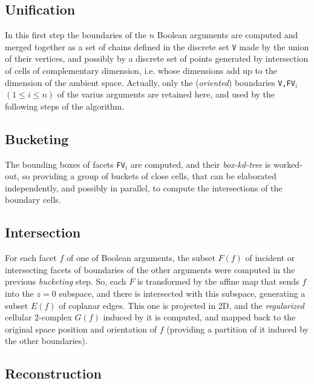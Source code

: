 \documentclass[11pt,oneside]{article}    %
\begin{document}
\subsection{Unification}

In this first step the boundaries of the $n$ Boolean arguments are computed and merged together as a set of chains defined in the discrete set $\texttt{V}$ made by the union of their vertices, and possibly by a discrete set of points generated by intersection of cells of complementary dimension, i.e. whose dimensions add up to the dimension of the ambient space.
Actually, only the (\emph{oriented}) boundaries \texttt{V,FV$_i$} $(1\leq i\leq n)$ of the varius arguments are retained here, and used by the following steps of the algorithm.

\subsection{Bucketing}

The bounding boxes of facets \texttt{FV$_i$} are computed, and their \emph{box-kd-tree} is worked-out, so providing a group of buckets of close cells, that can be elaborated independently, and possibly in parallel, to compute the intersections of the boundary cells. 

\subsection{Intersection}

For each facet $f$ of one of Boolean arguments, the subset $F(f)$ of incident or intersecting facets of boundaries of the other arguments were computed in the previous \emph{bucketing} step. So, each $F$ is transformed by the affine map that sends $f$ into the $z=0$ subspace, and there is intersected with this subspace, generating a subset $E(f)$ of coplanar edges.
This one is projected in 2D, and the \emph{regularized} cellular 2-complex $G(f)$ induced by it is computed, and mapped back to the original space position and orientation of $f$ (providing a partition of it induced by the other boundaries).

\subsection{Reconstruction}
\end{document}
